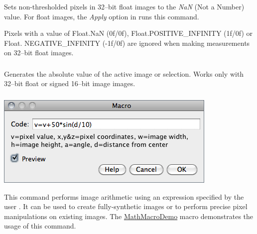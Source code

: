 \subsubsection{\protect{}\label{sub:NaN-Background}}

Sets non-thresholded pixels in 32--bit float images
to the \emph{NaN} (Not a Number) value. For float images, the \emph{Apply}
option in 
runs this command. 

Pixels with a value of Float.NaN (0f/0f), Float.POSITIVE\_INFINITY
(1f/0f) or Float. NEGATIVE\_INFINITY (-1f/0f) are ignored when making
measurements on 32--bit float images.


\subsubsection{\protect{}\label{sub:Abs}}

Generates the absolute value of the active image or selection. Works
only with 32--bit float or signed 16--bit image images.


\subsubsection[\protect\userinterface{Macro\ldots{}}]{\protect{}\label{sub:Macro...}}

\begin{minipage}[c][1\totalheight][t]{0.545\columnwidth}%
\includegraphics[scale=0.55]{images/MathMacro}%
\end{minipage}%
\begin{minipage}[c][1\totalheight][t]{0.455\columnwidth}%
This command performs image arithmetic using an expression specified
by the user \cite{C-MathMacro}. It can be used to create fully-synthetic
images or to perform precise pixel manipulations on existing images.
The \href{http://imagej.nih.gov/ij/macros/examples/MathMacroDemo.txt}{MathMacroDemo}
macro demonstrates the usage of this command.%
\end{minipage}


